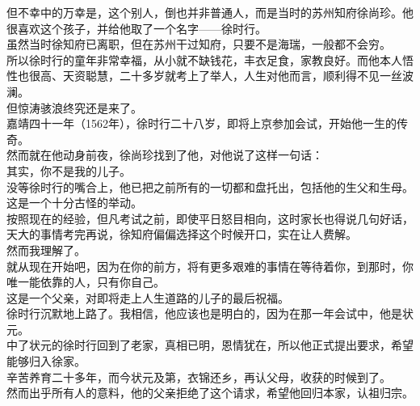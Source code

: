 \begin{multicols}{\theparacolNo}
但不幸中的万幸是，这个别人，倒也并非普通人，而是当时的苏州知府徐尚珍。他很喜欢这个孩子，并给他取了一个名字——徐时行。\\

虽然当时徐知府已离职，但在苏州干过知府，只要不是海瑞，一般都不会穷。\\

所以徐时行的童年非常幸福，从小就不缺钱花，丰衣足食，家教良好。而他本人悟性也很高、天资聪慧，二十多岁就考上了举人，人生对他而言，顺利得不见一丝波澜。\\

但惊涛骇浪终究还是来了。\\

嘉靖四十一年（1562年），徐时行二十八岁，即将上京参加会试，开始他一生的传奇。\\

然而就在他动身前夜，徐尚珍找到了他，对他说了这样一句话：\\

其实，你不是我的儿子。\\

没等徐时行的嘴合上，他已把之前所有的一切都和盘托出，包括他的生父和生母。\\

这是一个十分古怪的举动。\\

按照现在的经验，但凡考试之前，即使平日怒目相向，这时家长也得说几句好话，天大的事情考完再说，徐知府偏偏选择这个时候开口，实在让人费解。\\

然而我理解了。\\

就从现在开始吧，因为在你的前方，将有更多艰难的事情在等待着你，到那时，你唯一能依靠的人，只有你自己。\\

这是一个父亲，对即将走上人生道路的儿子的最后祝福。\\

徐时行沉默地上路了。我相信，他应该也是明白的，因为在那一年会试中，他是状元。\\

中了状元的徐时行回到了老家，真相已明，恩情犹在，所以他正式提出要求，希望能够归入徐家。\\

辛苦养育二十多年，而今状元及第，衣锦还乡，再认父母，收获的时候到了。\\

然而出乎所有人的意料，他的父亲拒绝了这个请求，希望他回归本家，认祖归宗。\\


\end{multicols}
